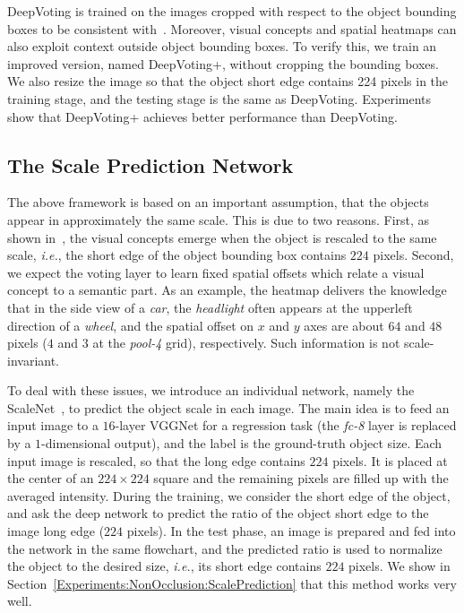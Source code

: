 \documentclass[10pt,twocolumn,letterpaper]{article}
\begin{document}
  DeepVoting is trained on the images cropped with respect to the object bounding boxes to be consistent with~\cite{wang2017detecting}. Moreover, visual concepts and spatial heatmaps can also exploit context outside object bounding boxes. To verify this, we train an improved version, named DeepVoting+, without cropping the bounding boxes. We also resize the image so that the object short edge contains 224 pixels in the training stage, and the testing stage is the same as DeepVoting. Experiments show that DeepVoting+ achieves better performance than DeepVoting.


  \subsection{The Scale Prediction Network}
  \label{Framework:ScaleNet}

  The above framework is based on an important assumption, that the objects appear in approximately the same scale. This is due to two reasons. First, as shown in~\cite{Wang_2017_VC_journal}, the visual concepts emerge when the object is rescaled to the same scale, {\em i.e.}, the short edge of the object bounding box contains $224$ pixels. Second, we expect the voting layer to learn fixed spatial offsets which relate a visual concept to a semantic part. As an example, the heatmap delivers the knowledge that in the side view of a {\em car}, the {\em headlight} often appears at the upperleft direction of a {\em wheel}, and the spatial offset on $x$ and $y$ axes are about $64$ and $48$ pixels ($4$ and $3$ at the {\em pool-4} grid), respectively. Such information is not scale-invariant.

  To deal with these issues, we introduce an individual network, namely the ScaleNet~\cite{Qiao_2017_ScaleNet}, to predict the object scale in each image. The main idea is to feed an input image to a $16$-layer VGGNet for a regression task (the {\em fc-8} layer is replaced by a $1$-dimensional output), and the label is the ground-truth object size. Each input image is rescaled, so that the long edge contains $224$ pixels. It is placed at the center of an $224\times224$ square and the remaining pixels are filled up with the averaged intensity. During the training, we consider the short edge of the object, and ask the deep network to predict the ratio of the object short edge to the image long edge ($224$ pixels). In the test phase, an image is prepared and fed into the network in the same flowchart, and the predicted ratio is used to normalize the object to the desired size, {\em i.e.}, its short edge contains $224$ pixels. We show in Section~\ref{Experiments:NonOcclusion:ScalePrediction} that this method works very well.
\end{document}
